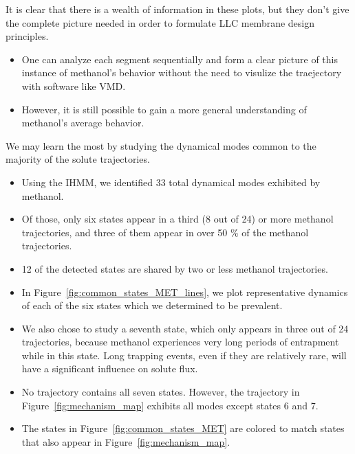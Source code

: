 \documentclass{article}
\begin{document}
  \noindent It is clear that there is a wealth of information in these plots, but they don't give the complete picture needed in order to formulate LLC membrane design principles.
  \begin{itemize}
    \item One can analyze each segment sequentially and form a clear picture
    of this instance of methanol's behavior without the need to visulize
    the traejectory with software like VMD.
    \item However, it is still possible to gain a more general understanding of methanol's average behavior.
  \end{itemize}
  
  \noindent We may learn the most by studying the dynamical modes common to the majority of 
  the solute trajectories.
  \begin{itemize}
    \item Using the IHMM, we identified 33 total dynamical modes exhibited by 
    methanol. 
    \item Of those, only six states appear in a third (8 out of 24) or more methanol 
    trajectories, and three of them appear in over 50 \% of the methanol trajectories.
    \item 12 of the detected states are shared by two or less methanol trajectories.  %
    \item In Figure~\ref{fig:common_states_MET_lines}, we plot representative dynamics
    of each of the six states which we determined to be prevalent.
    \item We also chose to study a seventh state, which only appears in three out of
    24 trajectories, because methanol experiences very long periods of entrapment
    while in this state. Long trapping events, even if they are relatively rare, will
    have a significant influence on solute flux.
    \item No trajectory contains all seven states. However, the trajectory in 
    Figure~\ref{fig:mechanism_map} exhibits all modes except states 6 and 7.
    \item The states in Figure~\ref{fig:common_states_MET} are colored to match
    states that also appear in Figure~\ref{fig:mechanism_map}.
  \end{itemize}
    
\end{document}
